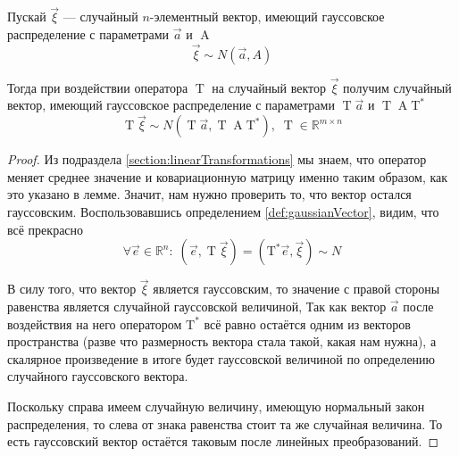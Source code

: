 \begin{lemma}\label{lemma:gaussRotated}
  Пускай $\vec{\xi}$ --- случайный $n$-элементный вектор, имеющий гауссовское
  распределение с параметрами $\vec{a}$ и $\operatorname{A}$
  $$\vec{\xi} \sim N\left( \vec{a}, A \right)$$

  Тогда при воздействии оператора $\operatorname{T}$ на случайный вектор
  $\vec{\xi}$ получим случайный вектор, имеющий гауссовское распределение с
  параметрами $\operatorname{T} \vec{a} $ и
  $\operatorname{T} \operatorname{A} \operatorname{T^*}$
  $$\operatorname{T} \vec{\xi} \sim N\left( \operatorname{T}\vec{a} ,
      \operatorname{T} \operatorname{A} \operatorname{T^*} \right),\;
      \operatorname{T} \in \mathbb{R}^{m \times n}$$
\end{lemma}
\begin{proof}
  Из подраздела \ref{section:linearTransformations} мы знаем, что оператор
  меняет среднее значение и ковариационную матрицу именно таким образом, как
  это указано в лемме. Значит, нам нужно проверить то, что вектор остался
  гауссовским. Воспользовавшись определением \ref{def:gaussianVector}, видим,
  что всё прекрасно
  $$\forall \vec{e} \in \mathbb{R}^n:\;
      \left( \vec{e}, \operatorname{T} \vec{\xi} \right)
      = \left( \operatorname{T^*} \vec{e} , \vec{\xi} \right) \sim N$$

  В силу того, что вектор $\vec{\xi}$ является гауссовским, то значение с
  правой стороны равенства является случайной гауссовской величиной, Так как
  вектор $\vec{a}$ после воздействия на него оператором $\operatorname{T^*}$ всё
  равно остаётся одним из векторов пространства (разве что размерность вектора
  стала такой, какая нам нужна), а скалярное произведение в итоге будет
  гауссовской величиной по определению случайного гауссовского вектора.

  Поскольку справа имеем случайную величину, имеющую нормальный закон
  распределения, то слева от знака равенства стоит та же случайная величина.
  То есть гауссовский вектор остаётся таковым после линейных преобразований.
\end{proof}

